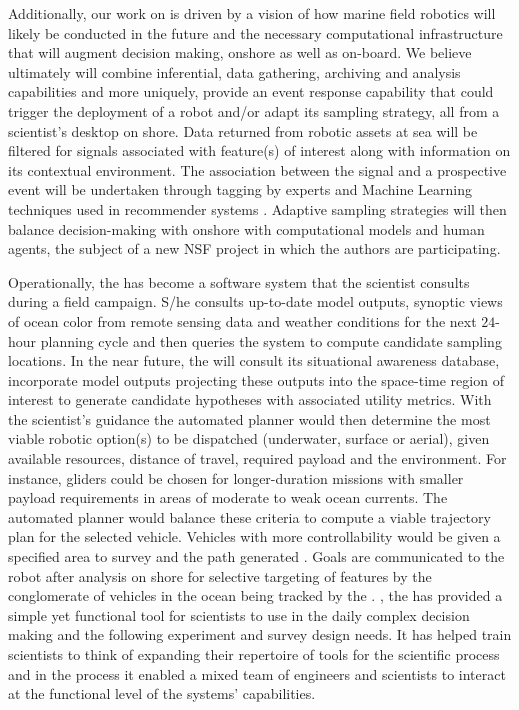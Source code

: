 Additionally, our work on \od is driven by a vision of how marine
field robotics will likely be conducted in the future and the
necessary computational infrastructure that will augment decision
making, onshore as well as on-board. We believe ultimately \od will
combine inferential, data gathering, archiving and analysis
capabilities and more uniquely, provide an event response capability
that could trigger the deployment of a robot and/or adapt its sampling
strategy, all from a scientist's desktop on shore. Data returned from
robotic assets at sea will be filtered for signals associated with
feature(s) of interest along with information on its contextual
environment. The association between the signal and a prospective
event will be undertaken through tagging by experts and Machine
Learning techniques used in recommender systems
\cite{Adomavicius05}. Adaptive sampling strategies will then balance
decision-making \situ with  onshore with computational
models and human agents, the subject of a new NSF project in which the
authors are participating.


Operationally, the \od has become a software system that the scientist
consults during a \can field campaign. S/he consults up-to-date model
outputs, synoptic views of ocean color from remote sensing data and
weather conditions for the next $24$-hour planning cycle and then
queries the system to compute candidate sampling locations. In the
near future, the \od will consult its situational awareness database,
incorporate model outputs projecting these outputs into the space-time
region of interest to generate candidate hypotheses with associated
utility metrics. With the scientist's guidance the automated planner
would then determine the most viable robotic option(s) to be
dispatched (underwater, surface or aerial), given available resources,
distance of travel, required payload and the environment. For
instance, gliders could be chosen for longer-duration missions with
smaller payload requirements in areas of moderate to weak ocean
currents. The automated planner would balance these criteria to
compute a viable trajectory plan for the selected vehicle. Vehicles
with more controllability would be given a specified area to survey
and the path generated \situ. Goals are communicated to the robot
after analysis on shore for selective targeting of features by the
conglomerate of vehicles in the ocean  being
tracked by the \od. , the \od has provided a simple
yet functional tool for scientists to use in the daily complex
decision making and the following experiment and survey design
needs. It has helped train scientists to think of expanding their
repertoire of tools for the scientific process and in the process it
enabled a mixed team of engineers and scientists to interact at the
functional level of the systems' capabilities.

